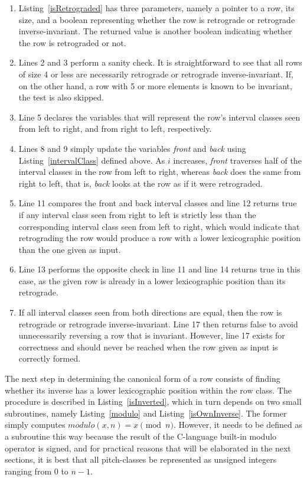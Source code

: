 \begin{enumerate}
\item Listing~\ref{isRetrograded} has three parameters, namely a pointer to a row, its size, and a boolean representing whether the row is retrograde or retrograde inverse-invariant. The returned value is another boolean indicating whether the row is retrograded or not.
\item Lines 2 and 3 perform a sanity check. It is straightforward to see that all rows of size 4 or less are necessarily retrograde or retrograde inverse-invariant. If, on the other hand, a row with 5 or more elements is known to be invariant, the test is also skipped.
\addtocounter{enumi}{2}
\item Line 5 declares the variables that will represent the row's interval classes seen from left to right, and from right to left, respectively.
\addtocounter{enumi}{2}
\item Lines 8 and 9 simply update the variables \emph{front} and \emph{back} using Listing~\ref{intervalClass} defined above. As $i$ increases, \emph{front} traverses half of the interval classes in the row from left to right, whereas \emph{back} does the same from right to left, that is, \emph{back} looks at the row as if it were retrograded.
\addtocounter{enumi}{2}
\item Line 11 compares the front and back interval classes and line 12 returns true if any interval class seen from right to left is strictly less than the corresponding interval class seen from left to right, which would indicate that retrograding the row would produce a row with a lower lexicographic position than the one given as input.
\addtocounter{enumi}{1}
\item Line 13 performs the opposite check in line 11 and line 14 returns true in this case, as the given row is already in a lower lexicographic position than its retrograde.
\addtocounter{enumi}{3}
\item If all interval classes seen from both directions are equal, then the row is retrograde or retrograde inverse-invariant. Line 17 then returns false to avoid unnecessarily reversing a row that is invariant. However, line 17 exists for correctness and should never be reached when the row given as input is correctly formed.
\end{enumerate}

The next step in determining the canonical form of a row consists of finding whether its inverse has a lower lexicographic position within the row class. The procedure is described in Listing~\ref{isInverted}, which in turn depends on two small subroutines, namely Listing~\ref{modulo} and Listing~\ref{isOwnInverse}. The former simply computes $modulo(x, n) = x \pmod{n}$. However, it needs to be defined as a subroutine this way because the result of the C-language built-in modulo operator is signed, and for practical reasons that will be elaborated in the next sections, it is best that all pitch-classes be represented as unsigned integers ranging from $0$ to $n - 1$.

